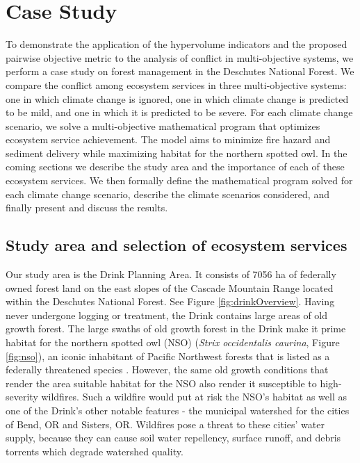 \section{Case Study}
\label{sec:caseStudy}
To demonstrate the application of the hypervolume indicators and the proposed pairwise objective metric to the analysis of conflict in multi-objective systems, we perform a case study on forest management in the Deschutes National Forest. We compare the conflict among ecosystem services in three multi-objective systems: one in which climate change is ignored, one in which climate change is predicted to be mild, and one in which it is predicted to be severe. For each climate change scenario, we solve a multi-objective mathematical program that optimizes ecosystem service achievement. The model aims to minimize fire hazard and sediment delivery while maximizing habitat for the northern spotted owl. In the coming sections we describe the study area and the importance of each of these ecosystem services. We then formally define the mathematical program solved for each climate change scenario, describe the climate scenarios considered, and finally present and discuss the results.

\subsection{Study area and selection of ecosystem services}
\label{subsec:studyArea}
Our study area is the Drink Planning Area. It consists of 7056 ha of federally owned forest land on the east slopes of the Cascade Mountain Range located within the Deschutes National Forest. See Figure \ref{fig:drinkOverview}. Having never undergone logging or treatment, the Drink contains large areas of old growth forest. The large swaths of old growth forest in the Drink make it prime habitat for the northern spotted owl (NSO) (\textit{Strix occidentalis caurina}, Figure \ref{fig:nso}), an iconic %
inhabitant of Pacific Northwest forests that is listed as a federally threatened species \cite{congress1973endangered}. However, the same old growth conditions that render the area suitable habitat for the NSO also render it susceptible to high-severity wildfires. Such a wildfire would put at risk the NSO's habitat \cite{courtney2004scientific} as well as one of the Drink's other notable features - the municipal watershed for the cities of Bend, OR and Sisters, OR. Wildfires pose a threat to these cities' water supply, because they can cause soil water repellency, surface runoff, and debris torrents \cite{ice2004effects} which degrade watershed quality.

